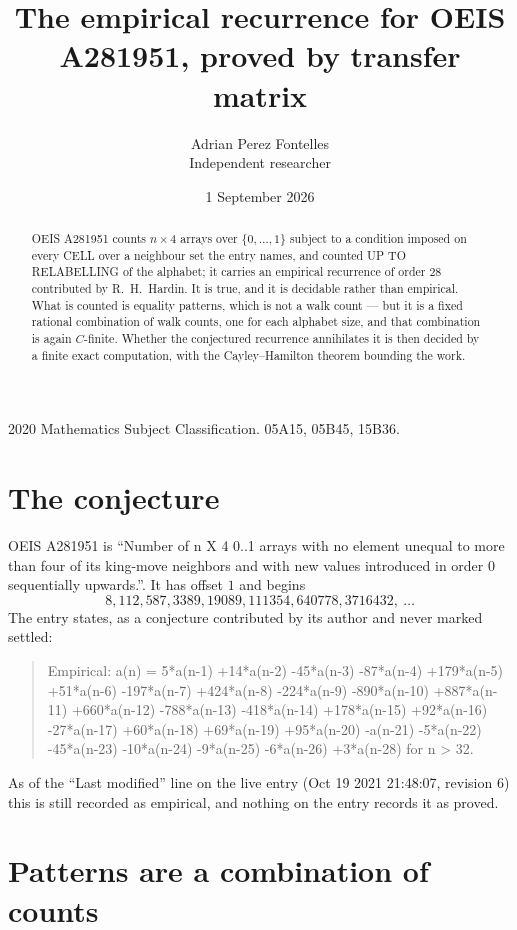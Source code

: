 \documentclass[11pt,a4paper]{article}
\title{The empirical recurrence for OEIS A281951, proved by transfer matrix}
\author{Adrian Perez Fontelles\\ \small Independent researcher}
\date{1 September 2026}
\theoremstyle{plain}
\theoremstyle{definition}
\begin{document}
\maketitle

\begin{abstract}
OEIS A281951 counts $n\times4$ arrays over $\{0,\dots,1\}$ subject to a condition imposed on
every CELL over a neighbour set the entry names, and counted UP TO RELABELLING of the
alphabet; it carries an empirical recurrence of order $28$ contributed by
R.~H.~Hardin. It is true, and it is decidable rather than empirical. What is counted is
equality patterns, which is not a walk count --- but it is a fixed rational combination of
walk counts, one for each alphabet size, and that combination is again $C$-finite. Whether the
conjectured recurrence annihilates it is then decided by a finite exact computation, with the
Cayley--Hamilton theorem bounding the work.
\end{abstract}

\noindent\small 2020 Mathematics Subject Classification. 05A15, 05B45, 15B36.\normalsize

\section{The conjecture}

OEIS A281951 is ``Number of n X 4 0..1 arrays with no element unequal to more than four of its king-move neighbors and with new values introduced in order 0 sequentially upwards.''. It has offset $1$ and begins
\[
8, 112, 587, 3389, 19089, 111354, 640778, 3716432,\ \dots
\]
The entry states, as a conjecture contributed by its author and never marked settled:
\begin{quote}
Empirical: a(n) = 5*a(n-1) +14*a(n-2) -45*a(n-3) -87*a(n-4) +179*a(n-5) +51*a(n-6) -197*a(n-7) +424*a(n-8) -224*a(n-9) -890*a(n-10) +887*a(n-11) +660*a(n-12) -788*a(n-13) -418*a(n-14) +178*a(n-15) +92*a(n-16) -27*a(n-17) +60*a(n-18) +69*a(n-19) +95*a(n-20) -a(n-21) -5*a(n-22) -45*a(n-23) -10*a(n-24) -9*a(n-25) -6*a(n-26) +3*a(n-28) for n > 32.
\end{quote}
As of the ``Last modified'' line on the live entry (Oct 19 2021 21:48:07, revision 6) this is still
recorded as empirical, and nothing on the entry records it as proved.

\section{Patterns are a combination of counts}
\end{document}
